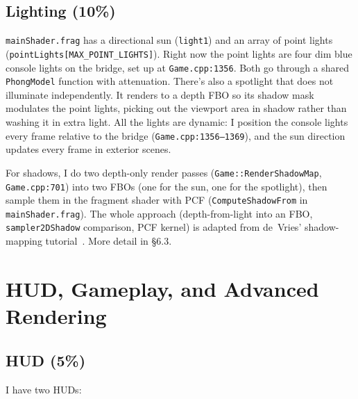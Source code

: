 \documentclass[11pt,a4paper]{article}
\begin{document}
\subsection{Lighting (10\%)}

\texttt{mainShader.frag} has a directional sun (\texttt{light1}) and an
array of point lights (\texttt{pointLights[MAX\_POINT\_LIGHTS]}). Right now
the point lights are four dim blue console lights on the bridge, set up at
\texttt{Game.cpp:1356}. Both go through a shared \texttt{PhongModel}
function with attenuation. There's also a spotlight that does not
illuminate independently. It renders to a depth FBO so its shadow
mask modulates the point lights, picking out the viewport area in
shadow rather than washing it in extra light. All the lights are
dynamic: I position the console lights every frame relative to the
bridge (\texttt{Game.cpp:1356--1369}), and the sun direction updates
every frame in exterior scenes.

For shadows, I do two depth-only render passes
(\texttt{Game::RenderShadowMap}, \texttt{Game.cpp:701}) into two FBOs (one
for the sun, one for the spotlight), then sample them in the fragment
shader with PCF (\texttt{ComputeShadowFrom} in \texttt{mainShader.frag}).
The whole approach (depth-from-light into an FBO, \texttt{sampler2DShadow}
comparison, PCF kernel) is adapted from de~Vries' shadow-mapping
tutorial~\cite{learnopengl_shadows}. More detail in \S6.3.


\section{HUD, Gameplay, and Advanced Rendering}

\subsection{HUD (5\%)}

I have two HUDs:
\end{document}
